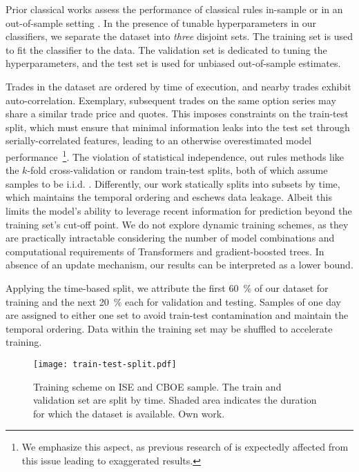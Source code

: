 Prior classical works assess the performance of classical rules in-sample \autocite[cp.][541]{ellisAccuracyTradeClassification2000} or in an out-of-sample setting \autocites[cp.][7--9]{grauerOptionTradeClassification2022}[][3814--3815]{chakrabartyTradeClassificationAlgorithms2007}.  In the presence of tunable hyperparameters in our classifiers, we separate the dataset into \emph{three} disjoint sets. The training set is used to fit the classifier to the data. The validation set is dedicated to tuning the hyperparameters, and the test set is used for unbiased out-of-sample estimates.

Trades in the dataset are ordered by time of execution, and nearby trades exhibit auto-correlation. Exemplary, subsequent trades on the same option series may share a similar trade price and quotes. This imposes constraints on the train-test split, which must ensure that minimal information leaks into the test set through serially-correlated features, leading to an otherwise overestimated model performance~\footnote{We emphasize this aspect, as previous research of \textcite[][14]{ronenMachineLearningTrade2022} is expectedly affected from this issue leading to exaggerated results.}. The violation of statistical independence, out rules methods like the $k$-fold cross-validation or random train-test splits, both of which assume samples to be i.i.d. \autocite[][103--105]{lopezdepradoAdvancesFinancialMachine2018}. Differently, our work statically splits into subsets by time, which maintains the temporal ordering and eschews data leakage. Albeit this limits the model's ability to leverage recent information for prediction beyond the training set's cut-off point. We do not explore dynamic training schemes, as they are practically intractable considering the number of model combinations and computational requirements of Transformers and gradient-boosted trees. In absence of an update mechanism, our results can be interpreted as a lower bound.

Applying the time-based split, we attribute the first \SI{60}{\percent} of our dataset for training and the next \SI{20}{\percent} each for validation and testing. Samples of one day are assigned to either one set to avoid train-test contamination and maintain the temporal ordering. Data within the training set may be shuffled to accelerate training.

\begin{figure}[ht]
    \centering
    \texttt{[image: train-test-split.pdf]}
    \caption[Training scheme on  and  Sample]{Training scheme on \gls{ISE} and \gls{CBOE} sample. The train and validation set are split by time. Shaded area  indicates the duration for which the dataset is available. Own work.}
    \label{fig:train-test-split}
\end{figure}

